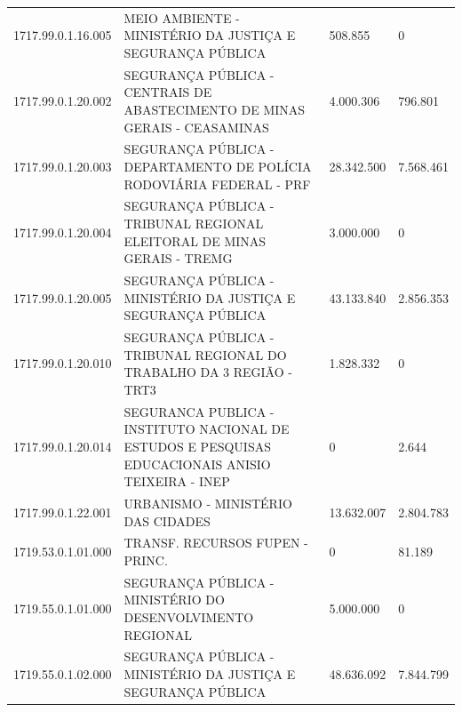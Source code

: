 \documentclass{article}
\begin{document}
\begin{longtable}[c]{m{2cm}|m{11cm}|m{2cm}m{2cm}}
\multicolumn{1}{C{2cm}|}{1717.99.0.1.16.005} & \multicolumn{1}{L{11cm}|}{MEIO AMBIENTE - MINISTÉRIO DA JUSTIÇA E SEGURANÇA PÚBLICA} & \multicolumn{1}{R{2cm}|}{508.855} & \multicolumn{1}{R{2cm}}{            0} \\
\multicolumn{1}{C{2cm}|}{1717.99.0.1.20.002} & \multicolumn{1}{L{11cm}|}{SEGURANÇA PÚBLICA - CENTRAIS DE ABASTECIMENTO DE MINAS GERAIS - CEASAMINAS} & \multicolumn{1}{R{2cm}|}{4.000.306} & \multicolumn{1}{R{2cm}}{796.801} \\
\multicolumn{1}{C{2cm}|}{1717.99.0.1.20.003} & \multicolumn{1}{L{11cm}|}{SEGURANÇA PÚBLICA - DEPARTAMENTO DE POLÍCIA RODOVIÁRIA FEDERAL - PRF} & \multicolumn{1}{R{2cm}|}{28.342.500} & \multicolumn{1}{R{2cm}}{7.568.461} \\
\multicolumn{1}{C{2cm}|}{1717.99.0.1.20.004} & \multicolumn{1}{L{11cm}|}{SEGURANÇA PÚBLICA - TRIBUNAL REGIONAL ELEITORAL DE MINAS GERAIS - TREMG} & \multicolumn{1}{R{2cm}|}{3.000.000} & \multicolumn{1}{R{2cm}}{            0} \\
\multicolumn{1}{C{2cm}|}{1717.99.0.1.20.005} & \multicolumn{1}{L{11cm}|}{SEGURANÇA PÚBLICA - MINISTÉRIO DA JUSTIÇA E SEGURANÇA PÚBLICA} & \multicolumn{1}{R{2cm}|}{43.133.840} & \multicolumn{1}{R{2cm}}{2.856.353} \\
\multicolumn{1}{C{2cm}|}{1717.99.0.1.20.010} & \multicolumn{1}{L{11cm}|}{SEGURANÇA PÚBLICA - TRIBUNAL REGIONAL DO TRABALHO DA 3 REGIÃO - TRT3} & \multicolumn{1}{R{2cm}|}{1.828.332} & \multicolumn{1}{R{2cm}}{            0} \\
\multicolumn{1}{C{2cm}|}{1717.99.0.1.20.014} & \multicolumn{1}{L{11cm}|}{SEGURANCA PUBLICA - INSTITUTO NACIONAL DE ESTUDOS E PESQUISAS EDUCACIONAIS ANISIO TEIXEIRA - INEP} & \multicolumn{1}{R{2cm}|}{            0} & \multicolumn{1}{R{2cm}}{2.644} \\
\multicolumn{1}{C{2cm}|}{1717.99.0.1.22.001} & \multicolumn{1}{L{11cm}|}{URBANISMO - MINISTÉRIO DAS CIDADES} & \multicolumn{1}{R{2cm}|}{13.632.007} & \multicolumn{1}{R{2cm}}{2.804.783} \\
\multicolumn{1}{C{2cm}|}{1719.53.0.1.01.000} & \multicolumn{1}{L{11cm}|}{TRANSF. RECURSOS FUPEN - PRINC.} & \multicolumn{1}{R{2cm}|}{            0} & \multicolumn{1}{R{2cm}}{81.189} \\
\multicolumn{1}{C{2cm}|}{1719.55.0.1.01.000} & \multicolumn{1}{L{11cm}|}{SEGURANÇA PÚBLICA - MINISTÉRIO DO DESENVOLVIMENTO REGIONAL} & \multicolumn{1}{R{2cm}|}{5.000.000} & \multicolumn{1}{R{2cm}}{            0} \\
\multicolumn{1}{C{2cm}|}{1719.55.0.1.02.000} & \multicolumn{1}{L{11cm}|}{SEGURANÇA PÚBLICA - MINISTÉRIO DA JUSTIÇA E SEGURANÇA PÚBLICA} & \multicolumn{1}{R{2cm}|}{48.636.092} & \multicolumn{1}{R{2cm}}{7.844.799} \\

\end{longtable}
\end{document}
